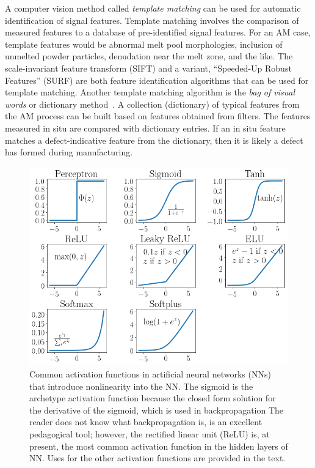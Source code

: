 A computer vision method called \textit{template matching} can be used for automatic identification of signal features. Template matching involves the comparison of measured features to a database of pre-identified signal features. For an AM case, template features would be abnormal melt pool morphologies, inclusion of unmelted powder particles, denudation near the melt zone, and the like. The scale-invariant feature transform (SIFT) \cite{Lowe2004} and a variant, ``Speeded-Up Robust Features'' (SURF) \cite{Bay2008} are both feature identification algorithms that can be used for template matching. Another template matching algorithm is the \textit{bag of visual words} or dictionary method~\cite{DeCost2015}. A collection (dictionary) of typical features from the AM process can be built based on features obtained from filters. The features measured in situ are compared with dictionary entries. If an in situ feature matches a defect-indicative feature from the dictionary, then it is likely a defect has formed during manufacturing.

\begin{figure}
	\includegraphics[width=0.85\linewidth]{Images/ActivationFunctions}
	\caption{Common activation functions in artificial neural networks (NNs) that introduce nonlinearity into the NN. The sigmoid is the archetype activation function because the closed form solution for the derivative of the sigmoid, which is used in backpropagation {\color{red} The reader does not know what backpropagation is}, is an excellent pedagogical tool; however, the rectified linear unit (ReLU) is, at present, the most common activation function in the hidden layers of NN. Uses for the other activation functions are provided in the text.}
	\label{fig:activation functions}
\end{figure}

